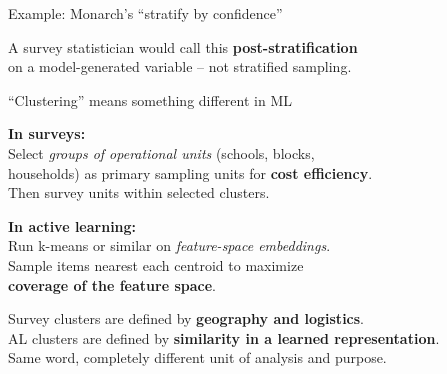 \documentclass[aspectratio=169,11pt]{beamer}
\begin{document}
\begin{frame}{Example: Monarch's ``stratify by confidence''}

\begin{center}
\end{center}

\vspace{0.5em}

A survey statistician would call this \textbf{post-stratification}\\
on a model-generated variable -- not stratified sampling.

\hfill \citep{monarch2021human}
\end{frame}

\begin{frame}{``Clustering'' means something different in ML}

\textbf{In surveys:}\\
Select \textit{groups of operational units} (schools, blocks,\\
households) as primary sampling units for \textbf{cost efficiency}.\\
Then survey units within selected clusters.

\vspace{1em}

\textbf{In active learning:}\\
Run k-means or similar on \textit{feature-space embeddings}.\\
Sample items nearest each centroid to maximize\\
\textbf{coverage of the feature space}.

\vspace{1em}

Survey clusters are defined by \textbf{geography and logistics}.\\
AL clusters are defined by \textbf{similarity in a learned representation}.\\
Same word, completely different unit of analysis and purpose.
\end{frame}
\end{document}
